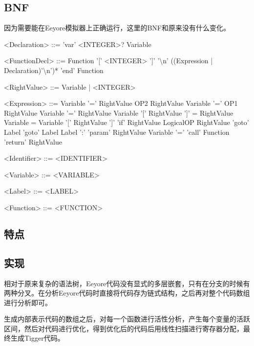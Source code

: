 \documentclass{ctexart}
\newenvironment{typewriterfont}{\ttfamily}{\par}
\begin{document}
\subsection{BNF}
因为需要能在Eeyore模拟器上正确运行，这里的BNF和原来没有什么变化。
\begin{typewriterfont}
\setlength{\grammarindent}{8em} %
\begin{grammar}
<Declaration> ::= 'var' <INTEGER>? Variable

<FunctionDecl> ::= Function '[' <INTEGER> ']' '\textbackslash n' ((Expression | Declaration)'\textbackslash n')* 'end' Function

<RightValue> ::= Variable | <INTEGER>

<Expression>	::=	Variable '=' RightValue OP2 RightValue
\alt Variable '=' OP1 RightValue
\alt Variable '=' RightValue
\alt Variable '[' RightValue ']' = RightValue
\alt Variable = Variable '[' RightValue ']'
\alt 'if' RightValue LogicalOP RightValue 'goto' Label
\alt 'goto' Label
\alt Label ':'
\alt 'param' RightValue
\alt Variable '=' 'call' Function
\alt 'return' RightValue


<Identifier>	::=	<IDENTIFIER>

<Variable> ::= <VARIABLE>

<Label> ::= <LABEL>

<Function> ::= <FUNCTION>

\end{grammar}
\end{typewriterfont}

\subsection{特点}

\subsection{实现}

相对于原来复杂的语法树，Eeyore代码没有显式的多层嵌套，只有在分支的时候有两种分叉。在分析Eeyore代码时直接将代码存为链式结构，之后再对整个代码数组进行分析即可。

生成内部表示代码的数组之后，对每一个函数进行活性分析，产生每个变量的活跃区间，然后对代码进行优化，得到优化后的代码后用线性扫描进行寄存器分配，最终生成Tigger代码。
\end{document}

